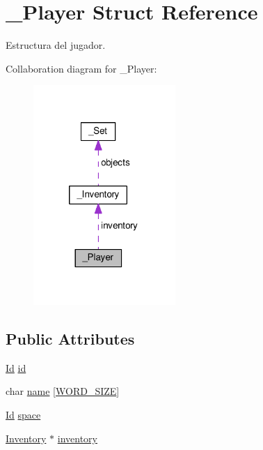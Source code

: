 \hypertarget{struct__Player}{\section{\+\_\+\+Player Struct Reference}
\label{struct__Player}
}


Estructura del jugador.  




Collaboration diagram for \+\_\+\+Player\+:
\nopagebreak
\begin{figure}[H]
\begin{center}
\leavevmode
\includegraphics[width=153pt]{struct__Player__coll__graph}
\end{center}
\end{figure}
\subsection*{Public Attributes}
\begin{DoxyCompactItemize}
\item 
\hyperlink{types_8h_a845e604fb28f7e3d97549da3448149d3}{Id} \hyperlink{struct__Player_a60d635cd063816a9c1bd873f4868bb90}{id}
\item 
char \hyperlink{struct__Player_adda99df91c28eb58d392f2b43fc6898f}{name} \mbox{[}\hyperlink{types_8h_a92ed8507d1cd2331ad09275c5c4c1c89}{W\+O\+R\+D\+\_\+\+S\+I\+Z\+E}\mbox{]}
\item 
\hyperlink{types_8h_a845e604fb28f7e3d97549da3448149d3}{Id} \hyperlink{struct__Player_aada8d7c35cffc55491f24f42d7991b14}{space}
\item 
\hyperlink{inventory_8h_a2253bf64ac4ce6a9c1d6f39c0b0d32a3}{Inventory} $\ast$ \hyperlink{struct__Player_a5e02924cb82ca61f74ba414d190aa29b}{inventory}
\end{DoxyCompactItemize}


